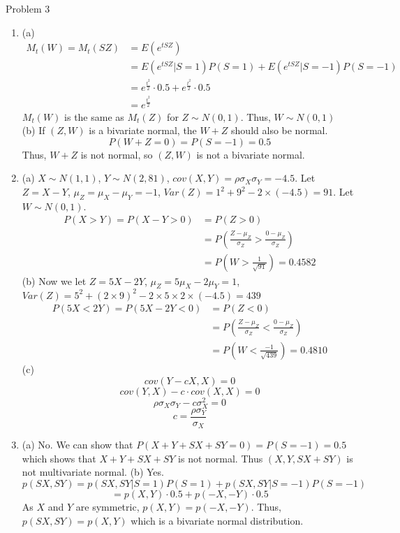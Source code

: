 \documentclass[12pt,letterpaper, onecolumn]{exam}
\begin{document}
\begin{questions}
    \question Problem 3
    \begin{solution}
    \begin{enumerate}
        \item (a) \begin{align*}
            M_t(W) = M_t(SZ) & = E(e^{tSZ}) \\
            & = E(e^{tSZ}|S=1)P(S=1)+E(e^{tSZ}|S=-1)P(S=-1) \\
            & = e^{\frac{t^2}{2}} \cdot 0.5 + e^{\frac{t^2}{2}} \cdot 0.5 \\
            & = e^{\frac{t^2}{2}}
        \end{align*}
        $M_t(W)$ is the same as $M_t(Z)$ for $Z \sim N(0,1)$. Thus, $W \sim N(0,1)$ \\
        (b) If $(Z,W)$ is a bivariate normal, the $W+Z$ should also be normal. $$P(W+Z = 0) = P(S = -1) = 0.5$$ Thus, $W+Z$ is not normal, so $(Z,W)$ is not a bivariate normal.\\
        \item (a) $X \sim N(1,1)$, $Y \sim N(2,81)$, $cov(X,Y) = \rho \sigma_X\sigma_Y = -4.5$. Let $Z=X-Y$, $\mu_Z = \mu_X-\mu_Y = -1$, $Var(Z) = 1^2+9^2-2\times(-4.5) = 91$. Let $W \sim N(0,1)$.
        \begin{align*}
            P(X>Y) = P(X-Y>0) & = P(Z>0) \\
            & = P(\frac{Z-\mu_Z}{\sigma_Z}>\frac{0-\mu_Z}{\sigma_Z}) \\
            & = P(W>\frac{1}{\sqrt{91}})  = 0.4582
        \end{align*}
        (b) Now we let $Z = 5X-2Y$, $\mu_Z = 5\mu_X-2\mu_Y = 1$, $Var(Z) = 5^2+(2\times9)^2-2\times5\times2\times(-4.5) = 439$
        \begin{align*}
            P(5X<2Y) = P(5X-2Y<0) & = P(Z<0) \\
            & = P(\frac{Z-\mu_Z}{\sigma_Z}<\frac{0-\mu_Z}{\sigma_Z}) \\
            & = P(W<\frac{-1}{\sqrt{439}})  = 0.4810
        \end{align*}
        (c) $$cov(Y-cX,X) = 0$$ $$cov(Y,X)-c\cdot cov(X,X) = 0$$  $$\rho\sigma_X\sigma_Y-c\sigma_X^2 = 0$$ $$c = \frac{\rho\sigma_Y}{\sigma_X}$$
        \item (a) No. We can show that $P(X+Y+SX+SY = 0) = P(S=-1) = 0.5$ which shows that $X+Y+SX+SY$ is not normal. Thus $(X,Y, SX+SY)$ is not multivariate normal.
        (b) Yes. $$p(SX,SY) = p(SX,SY|S=1)P(S=1)+p(SX,SY|S=-1)P(S=-1)$$
         $$= p(X,Y)\cdot 0.5 + p(-X,-Y) \cdot 0.5$$ As $X$ and $Y$ are symmetric, $p(X,Y) = p(-X,-Y)$. Thus, $p(SX,SY) = p(X,Y)$ which is a bivariate normal distribution.

\end{enumerate}
\end{solution}
\end{questions}
\end{document}
